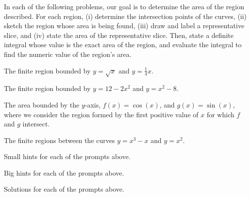 \begin{activity} \label{A:6.1.1}  In each of the following problems, our goal is to determine the area of the region described.  For each region, (i) determine the intersection points of the curves, (ii) sketch the region whose area is being found, (iii) draw and label a representative slice, and (iv) state the area of the representative slice.  Then, state a definite integral whose value is the exact area of the region, and evaluate the integral to find the numeric value of the region's area.
\ba
	\item The finite region bounded by $y = \sqrt{x}$ and $y = \frac{1}{4}x$.
	\item The finite region bounded by $y = 12-2x^2$ and $y = x^2 - 8$.
	\item The area bounded by the $y$-axis, $f(x) = \cos(x)$, and $g(x) = \sin(x)$, where we consider the region formed by the first positive value of $x$ for which $f$ and $g$ intersect.
	\item The finite regions between the curves $y = x^3-x$ and $y = x^2$.
\ea
\end{activity}
\begin{smallhint}
\ba
	\item Small hints for each of the prompts above.
\ea
\end{smallhint}
\begin{bighint}
\ba
	\item Big hints for each of the prompts above.
\ea
\end{bighint}
\begin{activitySolution}
\ba
	\item Solutions for each of the prompts above.
\ea
\end{activitySolution}
\aftera